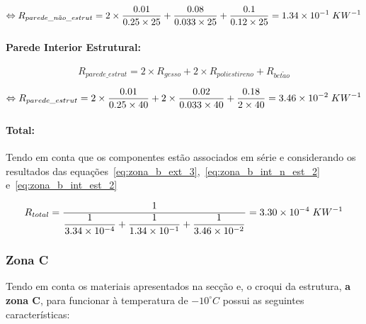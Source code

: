 \documentclass[12pt, a4paper]{article}
\begin{document}
\begin{equation}
	\Leftrightarrow R_{parede\_n\tilde{a}o\_estrut} =
	2 \times \dfrac{0.01}{0.25 \times 25} +
	\dfrac{0.08}{0.033 \times 25} +
	\dfrac{0.1}{0.12 \times 25} = 1.34 \times 10^{-1} \hspace{1mm} KW^{-1}
	\label{eq:zona_b_int_n_est_2}
\end{equation}

\paragraph{Parede Interior Estrutural:}\label{par:zona_b_int_est}

\begin{equation}
	R_{parede\_estrut} = 2 \times R_{gesso} + 2 \times R_{poliestireno} + R_{bet\tilde{a}o}
	\label{eq:zona_b_int_est_1}
\end{equation}

\begin{equation}
	\Leftrightarrow R_{parede\_estrut} =
		2 \times \dfrac{0.01}{0.25 \times 40} +
		2 \times \dfrac{0.02}{0.033 \times 40} +
		\dfrac{0.18}{2 \times 40}
		= 3.46 \times 10^{-2} \hspace{1mm} KW^{-1}
	\label{eq:zona_b_int_est_2}
\end{equation}


\paragraph{Total:}\label{par:zona_b_total} Tendo em conta que os componentes est\~ao
associados em série e considerando os resultados das
equa\c{c}\~oes~\ref*{eq:zona_b_ext_3},~\ref*{eq:zona_b_int_n_est_2} e~\ref*{eq:zona_b_int_est_2}

\begin{equation}
	R_{total} =
	\dfrac{1}{
		\dfrac{1}{
		3.34 \times 10^{-4}
		} +
		\dfrac{1}{
		1.34 \times 10^{-1}
		}+
		\dfrac{1}{
		3.46 \times 10^{-2}
		}
	}
	= 3.30 \times 10^{-4} \hspace{1mm} KW^{-1}
	\label{eq:zona_b_total}
\end{equation}

\pagebreak
\subsubsection{Zona C}\label{ssub:Zona C}

Tendo em conta os materiais apresentados na secção e, o croqui da estrutura, \textbf{a zona C}, para funcionar
à temperatura de $ -10^\circ C $ possui as seguintes características:
\end{document}
